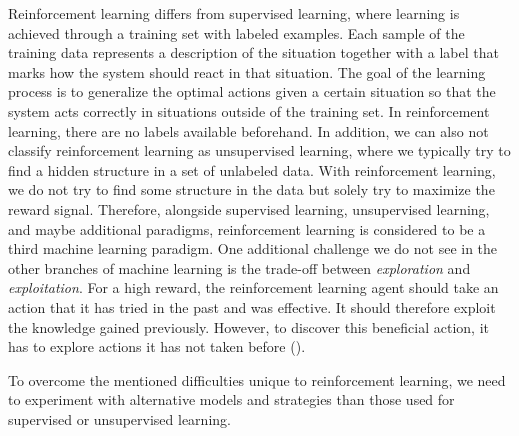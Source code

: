 Reinforcement learning differs from supervised learning, where learning is achieved through a training set with labeled examples. Each sample of the training data represents a description of the situation together with a label that marks how the system should react in that situation. The goal of the learning process is to generalize the optimal actions given a certain situation so that the system acts correctly in situations outside of the training set. In reinforcement learning, there are no labels available beforehand. In addition, we can also not classify reinforcement learning as unsupervised learning, where we typically try to find a hidden structure in a set of unlabeled data. With reinforcement learning, we do not try to find some structure in the data but solely try to maximize the reward signal. Therefore, alongside supervised learning, unsupervised learning, and maybe additional paradigms, reinforcement learning is considered to be a third machine learning paradigm. One additional challenge we do not see in the other branches of machine learning is the trade-off between \textit{exploration} and \textit{exploitation}. For a high reward, the reinforcement learning agent should take an action that it has tried in the past and was effective. It should therefore exploit the knowledge gained previously. However, to discover this beneficial action, it has to explore actions it has not taken before (\cite{sutton2018reinforcement}).

To overcome the mentioned difficulties unique to reinforcement learning, we need to experiment with alternative models and strategies than those used for supervised or unsupervised learning.



